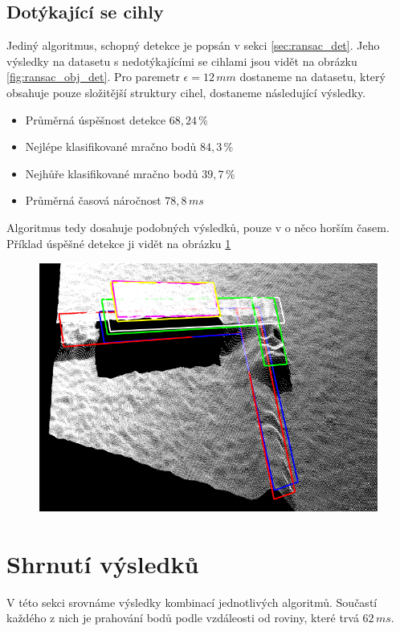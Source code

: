 \documentclass[twoside]{ctuthesis}
\begin{document}
\subsection{Dotýkající se cihly}
Jediný algoritmus, schopný detekce je popsán v sekci \ref{sec:ransac_det}. Jeho výsledky na datasetu s nedotýkajícími se cihlami jsou vidět na obrázku \ref{fig:ransac_obj_det}. Pro paremetr $\epsilon = 12\,mm$ dostaneme na datasetu, který obsahuje pouze složitější struktury cihel, dostaneme následující výsledky.
\begin{itemize}
    \item Průměrná úspěšnost detekce $68,24\,\%$
    \item Nejlépe klasifikované mračno bodů $84,3\,\%$
    \item Nejhůře klasifikované mračno bodů $39,7\,\%$
    \item Průměrná časová náročnost $78,8\,ms$
\end{itemize}
Algoritmus tedy dosahuje podobných výsledků, pouze v o něco horším časem. Příklad úspěšné detekce ji vidět na obrázku \ref{fig:all_layers_det}
\begin{figure}
    \centering
    \includegraphics[width = \linewidth]{pictures/upraveno_3rdlayaer.png}
    \caption{}
    \label{fig:all_layers_det}
\end{figure}
\section{Shrnutí výsledků}
V této sekci srovnáme výsledky kombinací jednotlivých algoritmů. Součastí každého z nich je prahování bodů podle vzdáleosti od roviny, které trvá $62\,ms$.
\end{document}
